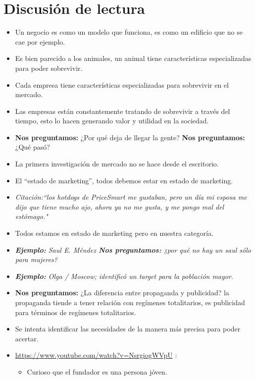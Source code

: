 \section{Discusión de lectura}
\begin{itemize}
    \item Un negocio es como un modelo que funciona, es como un edificio que no se cae por ejemplo.
    \item Es bien parecido a los animales, un animal tiene características  especializadas para poder sobrevivir.
    \item Cada empresa tiene características especializadas para sobrevivir en el mercado.
    \item Las empresas están constantemente tratando de sobrevivir a través del tiempo, esto lo hacen generando valor y utilidad en la sociedad.
    \item \textbf{Nos preguntamos:} ¿Por qué deja de llegar la gente? \textbf{Nos preguntamos:} ¿Qué pasó?
    \item La primera investigación de mercado no se hace desde el escritorio.
    \item El ``estado de marketing'', todos debemos estar en estado de marketing.
    \item \emph{Citación:``los hotdogs de PriceSmart me gustaban, pero un día mi esposa me dijo que tiene mucho ajo, ahora ya no me gusta, y me pongo mal del estómago."}
    \item Todos estamos en estado de marketing pero en nuestra categoría.
    \item \emph{\textbf{Ejemplo: }Saul E. Méndez \textbf{Nos preguntamos:} ¿por qué no hay un saul sólo para mujeres?}
    \item \emph{\textbf{Ejemplo: }Olga / Moscow;  identificó un target para la población mayor}.
    \item \textbf{Nos preguntamos:} ¿La diferencia entre propaganda y publicidad? la propaganda tiende a tener relación con regímenes totalitarios, es publicidad para términos de regímenes totalitarios. 
    \item Se intenta identificar las necesidades de la manera más precisa para poder acertar.
    \item \url{https://www.youtube.com/watch?v=NsrgiogWVpU} : 
        \begin{itemize}
            \item Curioso que el fundador es una persona jóven.
        \end{itemize}
    

\end{itemize}
